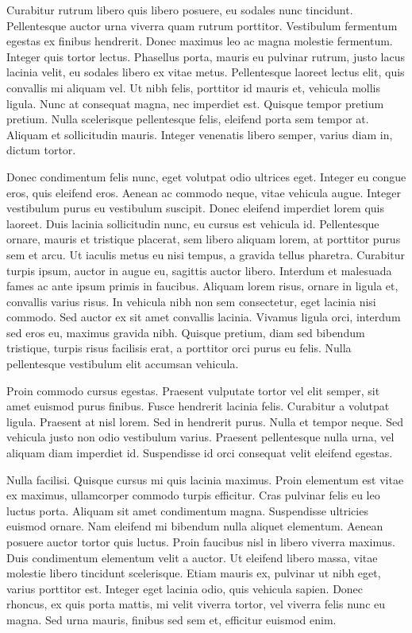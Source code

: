 \documentclass[10pt, onecolumn]{revtex4}    %
\begin{document}
Curabitur rutrum libero quis libero posuere, eu sodales nunc tincidunt. Pellentesque auctor urna viverra quam rutrum porttitor. Vestibulum fermentum egestas ex finibus hendrerit. Donec maximus leo ac magna molestie fermentum. Integer quis tortor lectus. Phasellus porta, mauris eu pulvinar rutrum, justo lacus lacinia velit, eu sodales libero ex vitae metus. Pellentesque laoreet lectus elit, quis convallis mi aliquam vel. Ut nibh felis, porttitor id mauris et, vehicula mollis ligula. Nunc at consequat magna, nec imperdiet est. Quisque tempor pretium pretium. Nulla scelerisque pellentesque felis, eleifend porta sem tempor at. Aliquam et sollicitudin mauris. Integer venenatis libero semper, varius diam in, dictum tortor.

Donec condimentum felis nunc, eget volutpat odio ultrices eget. Integer eu congue eros, quis eleifend eros. Aenean ac commodo neque, vitae vehicula augue. Integer vestibulum purus eu vestibulum suscipit. Donec eleifend imperdiet lorem quis laoreet. Duis lacinia sollicitudin nunc, eu cursus est vehicula id. Pellentesque ornare, mauris et tristique placerat, sem libero aliquam lorem, at porttitor purus sem et arcu. Ut iaculis metus eu nisi tempus, a gravida tellus pharetra. Curabitur turpis ipsum, auctor in augue eu, sagittis auctor libero. Interdum et malesuada fames ac ante ipsum primis in faucibus. Aliquam lorem risus, ornare in ligula et, convallis varius risus. In vehicula nibh non sem consectetur, eget lacinia nisi commodo. Sed auctor ex sit amet convallis lacinia. Vivamus ligula orci, interdum sed eros eu, maximus gravida nibh. Quisque pretium, diam sed bibendum tristique, turpis risus facilisis erat, a porttitor orci purus eu felis. Nulla pellentesque vestibulum elit accumsan vehicula.

Proin commodo cursus egestas. Praesent vulputate tortor vel elit semper, sit amet euismod purus finibus. Fusce hendrerit lacinia felis. Curabitur a volutpat ligula. Praesent at nisl lorem. Sed in hendrerit purus. Nulla et tempor neque. Sed vehicula justo non odio vestibulum varius. Praesent pellentesque nulla urna, vel aliquam diam imperdiet id. Suspendisse id orci consequat velit eleifend egestas.

Nulla facilisi. Quisque cursus mi quis lacinia maximus. Proin elementum est vitae ex maximus, ullamcorper commodo turpis efficitur. Cras pulvinar felis eu leo luctus porta. Aliquam sit amet condimentum magna. Suspendisse ultricies euismod ornare. Nam eleifend mi bibendum nulla aliquet elementum. Aenean posuere auctor tortor quis luctus. Proin faucibus nisl in libero viverra maximus. Duis condimentum elementum velit a auctor. Ut eleifend libero massa, vitae molestie libero tincidunt scelerisque. Etiam mauris ex, pulvinar ut nibh eget, varius porttitor est. Integer eget lacinia odio, quis vehicula sapien. Donec rhoncus, ex quis porta mattis, mi velit viverra tortor, vel viverra felis nunc eu magna. Sed urna mauris, finibus sed sem et, efficitur euismod enim.
\end{document}
